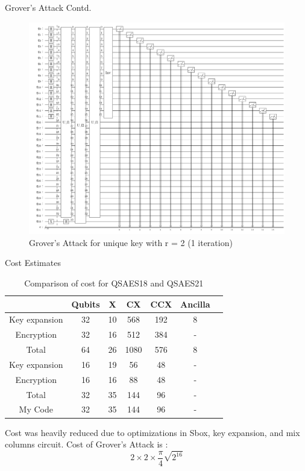 \begin{frame}{Grover's Attack Contd.}
    \begin{figure}[h!]
    \centering
    \includegraphics[width=0.8\linewidth]{saes21/grover-coupling-1-iter.pdf}
    \caption{Grover's Attack for unique key with r = 2 (1 iteration)}
    \label{fig:grov21u}
\end{figure}
\end{frame}
\begin{frame}{Cost Estimates}
    \begin{center}
\begin{table}[h!]
    \centering
    \begin{tabular}{ |c|c|c|c|c|c|c| } 
     \hline
       & Qubits & X & CX & CCX & Ancilla \\ \hline
     Key expansion & 32 & 10& 568 & 192 & 8 \\ \hline
     Encryption & 32 & 16 & 512 & 384 & - \\ \hline
     Total & 64 & 26 & 1080 & 576 & 8 \\ \hline
     Key expansion & 16 & 19& 56 & 48 & - \\ \hline
     Encryption & 16 & 16 & 88 & 48 & - \\ \hline
     Total & 32 & 35 & 144 & 96 & - \\ \hline
     My Code & 32 & 35 & 144 & 96 & - \\ \hline
    \end{tabular}
    \caption{Comparison of cost for QSAES18\cite{Almazrooie} and QSAES21\cite{Jang} }
    \label{tab:cost21}
\end{table}
\end{center}
\pause
Cost was heavily reduced due to optimizations in Sbox, key expansion, and mix columns circuit. Cost of Grover's Attack is :
\begin{equation*}
    2\times 2\times \frac{\pi}{4}\sqrt{2^{16}}
\end{equation*}
\end{frame}